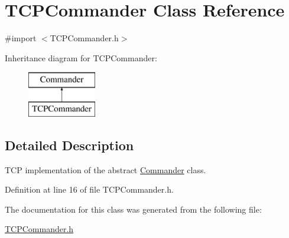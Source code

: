 \hypertarget{interface_t_c_p_commander}{
\section{TCPCommander Class Reference}
\label{interface_t_c_p_commander}
}


{\ttfamily \#import $<$TCPCommander.h$>$}

Inheritance diagram for TCPCommander:\begin{figure}[H]
\begin{center}
\leavevmode
\includegraphics[height=2.000000cm]{interface_t_c_p_commander}
\end{center}
\end{figure}


\subsection{Detailed Description}
TCP implementation of the abstract \hyperlink{interface_commander}{Commander} class. 

Definition at line 16 of file TCPCommander.h.



The documentation for this class was generated from the following file:\begin{DoxyCompactItemize}
\item 
\hyperlink{_t_c_p_commander_8h}{TCPCommander.h}\end{DoxyCompactItemize}
